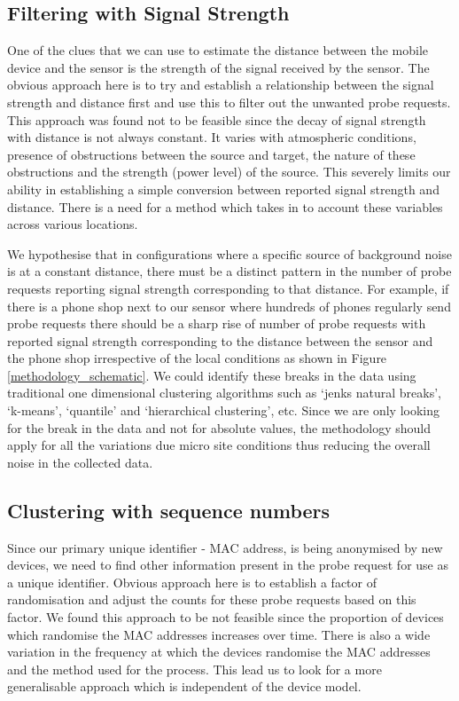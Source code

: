 \subsection{Filtering with Signal Strength} 

One of the clues that we can use to estimate the distance between the mobile
device and the sensor is the strength of the signal received by the sensor. The
obvious approach here is to try and establish a relationship between the signal
strength and distance first and use this to filter out the unwanted probe
requests. This approach was found not to be feasible since the decay of signal
strength with distance is not always constant. It varies with atmospheric
conditions, presence of obstructions between the source and target, the nature
of these obstructions and the strength (power level) of the source. This
severely limits our ability in establishing a simple conversion between reported
signal strength and distance. There is a need for a method which takes in to
account these variables across various locations.

We hypothesise that in configurations where a specific source of background
noise is at a constant distance, there must be a distinct pattern in the number
of probe requests reporting signal strength corresponding to that distance. For
example, if there is a phone shop next to our sensor where hundreds of phones
regularly send probe requests there should be a sharp rise of number of probe
requests with reported signal strength corresponding to the distance between the
sensor and the phone shop irrespective of the local conditions as shown in
Figure \ref{methodology_schematic}. We could identify these breaks in the data
using traditional one dimensional clustering algorithms such as `jenks natural
breaks', `k-means', `quantile' and `hierarchical clustering', etc. Since we are
only looking for the break in the data and not for absolute values, the
methodology should apply for all the variations due micro site conditions thus
reducing the overall noise in the collected data.

\subsection{Clustering with sequence numbers}

Since our primary unique identifier - MAC address, is being anonymised by new
devices, we need to find other information present in the probe request for use
as a unique identifier. Obvious approach here is to establish a factor of
randomisation and adjust the counts for these probe requests based on this
factor. We found this approach to be not feasible since the proportion of
devices which randomise the MAC addresses increases over time. There is also a
wide variation in the frequency at which the devices randomise the MAC addresses
and the method used for the process. This lead us to look for a more
generalisable approach which is independent of the device model.

